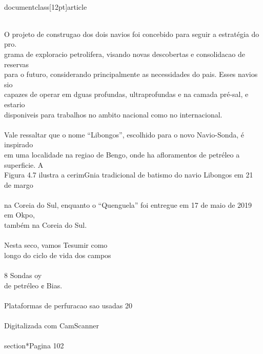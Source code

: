 \\documentclass[12pt]{article}
\begin{document}
\\
O projeto de construgao dos dois navios foi concebido para seguir a estratégia do pro.\\
grama de exploracio petrolifera, visando novas descobertas e consolidacao de reservas\\
para o futuro, considerando principalmente as necessidades do pais. Esses navios sio\\
capazes de operar em dguas profundas, ultraprofundas e na camada pré-sal, e estario\\
disponiveis para trabalhos no ambito nacional como no internacional.\\
\\
Vale ressaltar que o nome “Libongos”, escolhido para o novo Navio-Sonda, é inspirado\\
em uma localidade na regiao de Bengo, onde ha afloramentos de petréleo a superficie. A\\
Figura 4.7 ilustra a cerimGnia tradicional de batismo do navio Libongos em 21 de margo\\
\\
na Coreia do Sul, enquanto o “Quenguela” foi entregue em 17 de maio de 2019 em Okpo,\\
também na Coreia do Sul.\\
\\
Nesta seco, vamos Tesumir como\\
longo do ciclo de vida dos campos\\
\\
8 Sondas oy\\
de petréleo ¢ Bias.\\
\\
Plataformas de perfuracao sao usadas 20\\
\\
Digitalizada com CamScanner\\

\\section*{Pagina 102}
\end{document}
